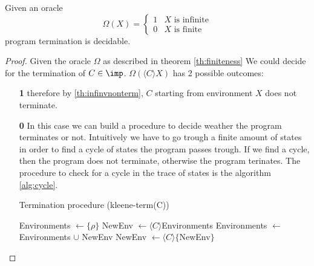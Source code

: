 \begin{theorem}\label{th:finiteness}
  Given an oracle
  \[
  \Omega(X) = \begin{cases}
    1 & X \text{ is infinite} \\
    0 & X \text{ is finite}
  \end{cases}
  \]
  program termination is decidable.
  
  \begin{proof}
    Given the oracle \(\Omega\) as described in theorem
    \ref{th:finiteness} We could decide for the termination of \(C \in
    \imp\). \(\Omega(\langle C \rangle X)\) has 2 possible outcomes:
    \begin{itemize}
    \item[\textbf{1}] therefore by \ref{th:infinvnonterm}, \(C\)
      starting from environment \(X\) does not terminate.
    \item[\textbf{0}] In this case we can build a procedure to decide
      weather the program terminates or not. Intuitively we have to go
      trough a finite amount of states in order to find a cycle of
      states the program passes trough. If we find a cycle, then the
      program does not terminate, otherwise the program terinates.
      The procedure to check for a cycle in the trace of states is the
      algorithm \ref{alg:cycle}.
      \begin{algorithm}
        \caption{Termination procedure (kleene-term(C))}\label{alg:term}
        \label{alg:cycle}
        \begin{algorithmic}
          \State Environments \(\gets \{\rho\}\)
          \State NewEnv \(\gets \langle C \rangle\)Environments
          \State Environments \(\gets\) Environments \(\cup\) NewEnv
          \State NewEnv \(\gets \langle C \rangle \{\)NewEnv\(\}\)
          \EndWhile

           \State {}
           \EndIf

          \State {} 
        \end{algorithmic}
      \end{algorithm}


\end{itemize}
\end{proof}
\end{theorem}
